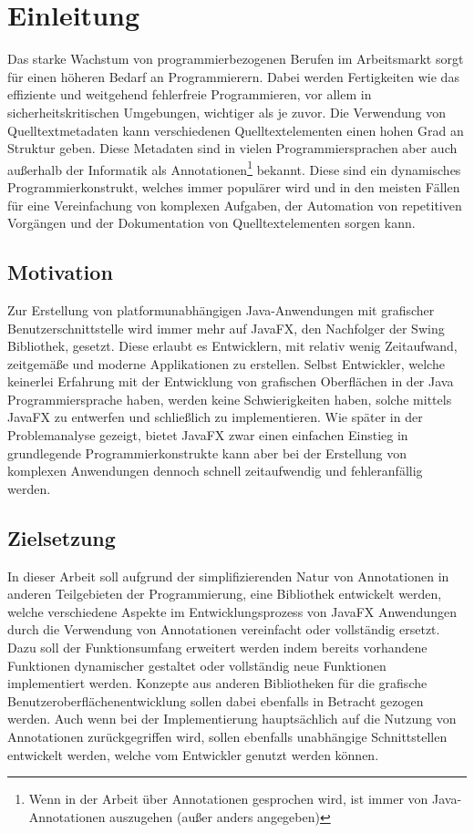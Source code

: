 \chapter{Einleitung}
\label{einleitung}
Das starke Wachstum von programmierbezogenen Berufen im Arbeitsmarkt sorgt für einen höheren Bedarf an Programmierern. Dabei werden Fertigkeiten wie das effiziente und weitgehend fehlerfreie Programmieren, vor allem in sicherheitskritischen Umgebungen, wichtiger als je zuvor. Die Verwendung von Quelltextmetadaten kann verschiedenen Quelltextelementen einen hohen Grad an Struktur geben. Diese Metadaten sind in vielen Programmiersprachen aber auch außerhalb der Informatik als Annotationen\footnote{Wenn in der Arbeit über Annotationen gesprochen wird, ist immer von Java-Annotationen auszugehen (außer anders angegeben)} bekannt. Diese sind ein dynamisches Programmierkonstrukt, welches immer populärer wird und in den meisten Fällen für eine Vereinfachung von komplexen Aufgaben, der Automation von repetitiven Vorgängen und der Dokumentation von Quelltextelementen sorgen kann.
\section{Motivation}
\label{motivation}
Zur Erstellung von platformunabhängigen Java-Anwendungen mit grafischer Benutzerschnittstelle wird immer mehr auf JavaFX, den Nachfolger der Swing Bibliothek, gesetzt. Diese erlaubt es Entwicklern, mit relativ wenig Zeitaufwand, zeitgemäße und moderne Applikationen zu erstellen. Selbst Entwickler, welche keinerlei Erfahrung mit der Entwicklung von grafischen Oberflächen in der Java Programmiersprache haben, werden keine Schwierigkeiten haben, solche mittels JavaFX zu entwerfen und schließlich zu implementieren. Wie später in der Problemanalyse gezeigt, bietet JavaFX zwar einen einfachen Einstieg in grundlegende Programmierkonstrukte kann aber bei der Erstellung von komplexen Anwendungen dennoch schnell zeitaufwendig und fehleranfällig werden.
\section{Zielsetzung}
\label{zielsetzung}
In dieser Arbeit soll aufgrund der simplifizierenden Natur von Annotationen in anderen Teilgebieten der Programmierung, eine Bibliothek entwickelt werden, welche verschiedene Aspekte im Entwicklungsprozess von JavaFX Anwendungen durch die Verwendung von Annotationen vereinfacht oder vollständig ersetzt. Dazu soll der Funktionsumfang erweitert werden indem bereits vorhandene Funktionen dynamischer gestaltet oder vollständig neue Funktionen implementiert werden. Konzepte aus anderen Bibliotheken für die grafische Benutzeroberflächenentwicklung sollen dabei ebenfalls in Betracht gezogen werden. Auch wenn bei der Implementierung hauptsächlich auf die Nutzung von Annotationen zurückgegriffen wird, sollen ebenfalls unabhängige Schnittstellen entwickelt werden, welche vom Entwickler genutzt werden können.
